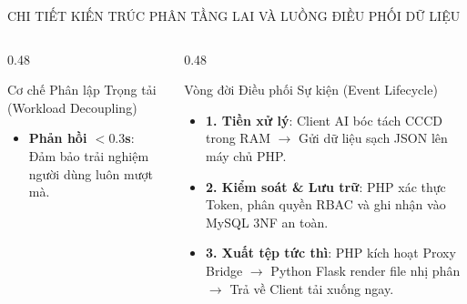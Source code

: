 \documentclass[aspectratio=169, 10pt]{beamer}
\begin{document}
\begin{frame}{CHI TIẾT KIẾN TRÚC PHÂN TẦNG LAI VÀ LUỒNG ĐIỀU PHỐI DỮ LIỆU}
\begin{columns}[T]
\begin{column}{0.48\textwidth}
\begin{highlightCard}{Cơ chế Phân lập Trọng tải (Workload Decoupling)}
\begin{itemize}
          \item \textbf{Phản hồi $<0.3$s}: Đảm bảo trải nghiệm người dùng luôn mượt mà.
        \end{itemize}
      \end{highlightCard}
    \end{column}
    \begin{column}{0.48\textwidth}
      \begin{greenCard}{Vòng đời Điều phối Sự kiện (Event Lifecycle)}
        \fontsize{6.8pt}{8.5pt}\selectfont
        \begin{itemize}
          \setlength{\itemsep}{1.2pt}
          \item \textbf{1. Tiền xử lý}: Client AI bóc tách CCCD trong RAM $\to$ Gửi dữ liệu sạch JSON lên máy chủ PHP.
          \item \textbf{2. Kiểm soát \& Lưu trữ}: PHP xác thực Token, phân quyền RBAC và ghi nhận vào MySQL 3NF an toàn.
          \item \textbf{3. Xuất tệp tức thì}: PHP kích hoạt Proxy Bridge $\to$ Python Flask render file nhị phân $\to$ Trả về Client tải xuống ngay.
        \end{itemize}
      \end{greenCard}
    \end{column}
  \end{columns}
\end{frame}
\end{document}
